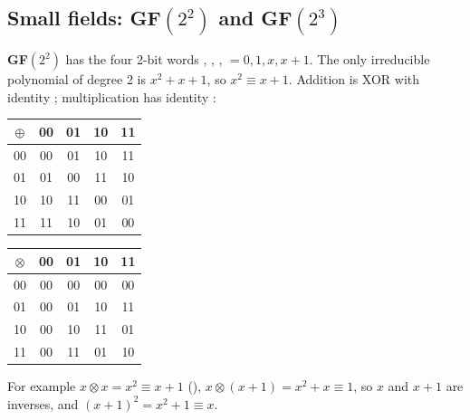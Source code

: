 \subsection{Small fields: GF$(2^2)$ and GF$(2^3)$}
\textbf{GF$(2^2)$} has the four 2-bit words , , ,  $= 0, 1, x, x + 1$. The only irreducible polynomial of degree 2 is $x^2 + x + 1$, so $x^2 \equiv x + 1$. Addition is XOR with identity ; multiplication has identity :
\begin{center}\small
\begin{tabular}{@{}c|cccc@{}}
$\oplus$ & 00 & 01 & 10 & 11\\\hline
00 & 00 & 01 & 10 & 11\\
01 & 01 & 00 & 11 & 10\\
10 & 10 & 11 & 00 & 01\\
11 & 11 & 10 & 01 & 00\\
\end{tabular}
\qquad
\begin{tabular}{@{}c|cccc@{}}
$\otimes$ & 00 & 01 & 10 & 11\\\hline
00 & 00 & 00 & 00 & 00\\
01 & 00 & 01 & 10 & 11\\
10 & 00 & 10 & 11 & 01\\
11 & 00 & 11 & 01 & 10\\
\end{tabular}
\end{center}
For example $x \otimes x = x^2 \equiv x + 1$ (), $x \otimes (x + 1) = x^2 + x \equiv 1$, so $x$ and $x + 1$ are inverses, and $(x + 1)^2 = x^2 + 1 \equiv x$.

